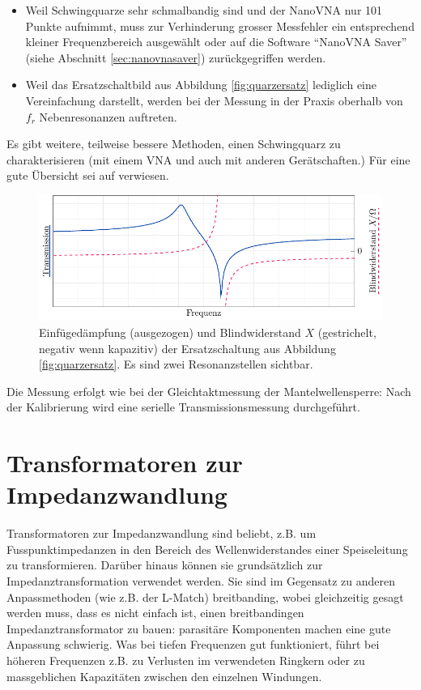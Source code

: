 \documentclass[twoside,a4paper,11pt,halfparskip,DIV=11,notitlepage]{scrartcl}
\begin{document}
\begin{itemize}
    \item Weil Schwingquarze sehr schmalbandig sind und der NanoVNA nur 101 Punkte aufnimmt, muss zur Verhinderung grosser Messfehler ein entsprechend kleiner Frequenzbereich ausgewählt
        oder auf die Software ``NanoVNA Saver'' (siehe Abschnitt \ref{sec:nanovnasaver}) zurückgegriffen werden.
    \item Weil das Ersatzschaltbild aus Abbildung \ref{fig:quarzersatz} lediglich eine Vereinfachung darstellt, werden bei der Messung in der Praxis oberhalb von $f_r$ Nebenresonanzen auftreten.
\end{itemize}

Es gibt weitere, teilweise bessere Methoden, einen Schwingquarz zu charakterisieren (mit einem VNA und auch mit
anderen Gerätschaften.) Für eine gute Übersicht sei auf \cite{kortke2002} verwiesen.

\begin{figure}[H]
\begin{center}
    \includegraphics{figures/quartz_plot/quartz_plot.pdf}
\end{center}
\caption{Einfügedämpfung (ausgezogen) und Blindwiderstand $X$ (gestrichelt, negativ wenn kapazitiv) der Ersatzschaltung
aus Abbildung \ref{fig:quarzersatz}. Es sind zwei Resonanzstellen sichtbar.}
\label{fig:quarzidealplot}
\end{figure}

Die Messung erfolgt wie bei der Gleichtaktmessung der Mantelwellensperre: Nach der Kalibrierung wird
eine serielle Transmissionsmessung durchgeführt.

\newpage %
\section{Transformatoren zur Impedanzwandlung}\label{sec:impedanztrafo}
Transformatoren zur Impedanzwandlung sind beliebt, z.B. um Fusspunktimpedanzen in den Bereich
des Wellenwiderstandes einer Speiseleitung zu transformieren. Darüber hinaus
können sie grundsätzlich zur Impedanztransformation verwendet werden. Sie sind im Gegensatz zu
anderen Anpassmethoden (wie z.B. der L-Match) breitbanding, wobei gleichzeitig gesagt
werden muss, dass es nicht einfach ist, einen breitbandingen Impedanztransformator zu bauen:
parasitäre Komponenten machen eine gute Anpassung schwierig. Was bei tiefen Frequenzen gut
funktioniert, führt bei höheren Frequenzen z.B. zu Verlusten im verwendeten Ringkern oder
zu massgeblichen Kapazitäten zwischen den einzelnen Windungen.
\end{document}
